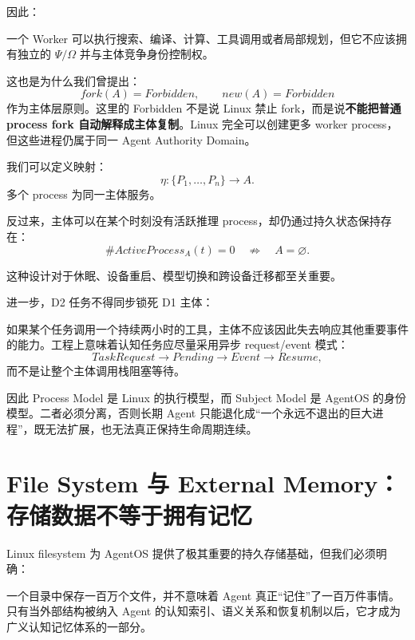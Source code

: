 因此：
\begin{statementbox}
\centering
{}
\end{statementbox}
一个 Worker 可以执行搜索、编译、计算、工具调用或者局部规划，但它不应该拥有独立的 $\Psi/\Omega$ 并与主体竞争身份控制权。

这也是为什么我们曾提出：
\[
fork(A)=Forbidden,
\qquad
new(A)=Forbidden
\]
作为主体层原则。这里的 Forbidden 不是说 Linux 禁止 fork，而是说\textbf{不能把普通 process fork 自动解释成主体复制}。Linux 完全可以创建更多 worker process，但这些进程仍属于同一 Agent Authority Domain。

我们可以定义映射：
\[
\eta:
\{P_1,\ldots,P_n\}
\rightarrow
A.
\]
多个 process 为同一主体服务。

反过来，主体可以在某个时刻没有活跃推理 process，却仍通过持久状态保持存在：
\[
\#ActiveProcess_A(t)=0
\quad\nRightarrow\quad
A=\varnothing.
\]

这种设计对于休眠、设备重启、模型切换和跨设备迁移都至关重要。

进一步，D2 任务不得同步锁死 D1 主体：
\begin{statementbox}
\centering
{}
\end{statementbox}
如果某个任务调用一个持续两小时的工具，主体不应该因此失去响应其他重要事件的能力。工程上意味着认知任务应尽量采用异步 request/event 模式：
\[
TaskRequest
\rightarrow
Pending
\rightarrow
Event
\rightarrow
Resume,
\]
而不是让整个主体调用栈阻塞等待。

因此 Process Model 是 Linux 的执行模型，而 Subject Model 是 AgentOS 的身份模型。二者必须分离，否则长期 Agent 只能退化成“一个永远不退出的巨大进程”，既无法扩展，也无法真正保持生命周期连续。

\section{File System 与 External Memory：存储数据不等于拥有记忆}

Linux filesystem 为 AgentOS 提供了极其重要的持久存储基础，但我们必须明确：
\begin{statementbox}
\centering
{}
\end{statementbox}
一个目录中保存一百万个文件，并不意味着 Agent 真正“记住”了一百万件事情。只有当外部结构被纳入 Agent 的认知索引、语义关系和恢复机制以后，它才成为广义认知记忆体系的一部分。

